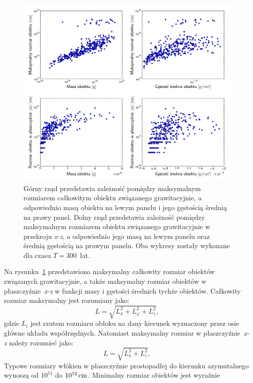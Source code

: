 \begin{figure}[ht]
   \centering
   \includegraphics[width=0.95\linewidth]{figures/fig_mass_size}
   \caption{Górny rząd przedstawia zależność pomiędzy maksymalnym rozmiarem
      całkowitym obiektu związanego grawitacyjnie, a odpowiednio masą obiektu na
      lewym panelu i jego gęstością średnią na prawy panel. Dolny rząd
      przedstawia zależność pomiędzy maksymalnym rozmiarem obiektu związanego
   grawitacyjnie w przekroju \emph{x-z}, a odpowiednio jego masą na lewym panelu
oraz średnią gęstością na prawym panelu. Oba  wykresy zostały wykonane dla czasu
$T=300$~lat. }
   \label{fig:mass_size}
\end{figure}
%
\par Na rysunku~\ref{fig:mass_size} przedstawiono maksymalny całkowity rozmiar
obiektów związanych grawitacyjnie, a także maksymalny rozmiar obiektów w
płaszczyźnie~\emph{x-z} w funkcji masy i gęstości średnich tychże obiektów.
Całkowity rozmiar maksymalny jest rozumiany jako:
\begin{equation}
   L = \sqrt{L_x^2 + L_\varphi^2 + L_z^2},
\end{equation}
gdzie $L_i$ jest rzutem rozmiaru obłoku na dany kierunek wyznaczony przez osie
główne układu współrzędnych. Natomiast maksymalny rozmiar w
płaszczyźnie~\emph{x-z} należy rozumieć jako:
\begin{equation}
   L = \sqrt{L_x^2 + L_z^2},
\end{equation}
Typowe rozmiary włókien w płaszczyźnie prostopadłej do kierunku azymutalnego
wynoszą od $10^{11}$ do $10^{12}\hbox{$\thinspace\textrm{cm}$}$. Minimalny rozmiar obiektów jest wyraźnie
